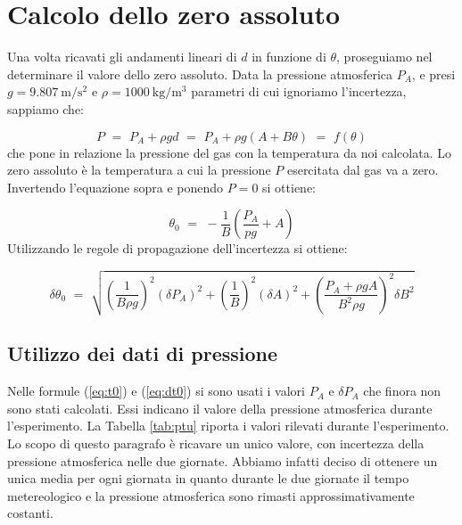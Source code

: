 \section{Calcolo dello zero assoluto}

Una volta ricavati gli andamenti lineari di $d$ in funzione di $\theta$, proseguiamo nel determinare il valore dello zero assoluto.
Data la pressione atmosferica $P_A$, e presi $g = \SI{9.807}{\meter\per\square\second}$ e
$\rho = \SI{1000}{\kilo\gram\per\cubic\metre}$ parametri di cui ignoriamo l'incertezza, sappiamo che:

\begin{equation}
	P \,\, = \,\, P_A + \rho g d \,\, = \,\, P_A + \rho g (A + B \theta) \,\, = \,\, f(\theta)
\end{equation}
%
che pone in relazione la pressione del gas con la temperatura da noi calcolata. Lo zero assoluto è la temperatura a cui la
pressione $P$ esercitata dal gas va a zero. Invertendo l'equazione sopra e ponendo $P = 0$ si ottiene:

\begin{equation}
	\theta_0 \,\, = \,\, - \frac{1}{B} \left( \frac{P_A}{pg} + A \right)
    \label{eq:t0}
\end{equation}
%
Utilizzando le regole di propagazione dell'incertezza si ottiene:

\begin{equation}
    \delta \theta_0 \,\, = \,\, \sqrt{\left(\frac{1}{B \rho g}\right)^2 (\delta P_A)^2 +
    \left(\frac{1}{B}\right)^2 (\delta A)^2 + \left(\frac{P_A + \rho g A}{B^2 \rho g} \right)^2 \delta B^2}
    \label{eq:dt0}
\end{equation}


\subsection{Utilizzo dei dati di pressione}
\label{press}

Nelle formule (\ref{eq:t0}) e (\ref{eq:dt0}) si sono usati i valori $P_A$ e $\delta P_A$ che finora non sono stati calcolati.
Essi indicano il valore della pressione atmosferica durante l'esperimento. La Tabella \ref{tab:ptu} riporta i valori rilevati
durante l'esperimento. Lo scopo di questo paragrafo è ricavare un unico valore, con incertezza della pressione atmosferica nelle
due giornate. Abbiamo infatti deciso di ottenere un unica media per ogni giornata in quanto durante le due giornate il tempo metereologico e la
pressione atmosferica sono rimasti approssimativamente costanti.

